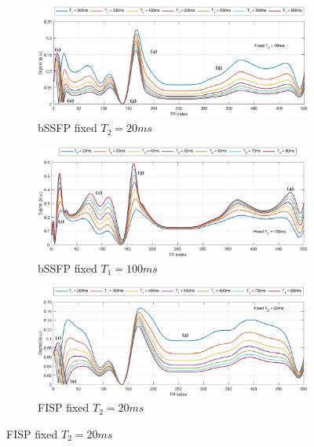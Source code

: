\begin{figure}[ht]
    \centering
    \begin{subfigure}[b]{.75\textwidth}
        \includegraphics[width=\textwidth]{images/mrf/mrfDictionaryBSSFPaDesc}
        \caption{bSSFP fixed $T_2 = 20ms$}
    \end{subfigure}
    
    \begin{subfigure}[b]{.75\textwidth}
        \includegraphics[width=\textwidth]{images/mrf/mrfDictionaryBSSFPbDesc}
        \caption{bSSFP fixed $T_1 = 100ms$}
    \end{subfigure}
    
    \begin{subfigure}[b]{.75\textwidth}
        \includegraphics[width=\textwidth]{images/mrf/mrfDictionaryFISPaDesc}
        \caption{FISP fixed $T_2 = 20ms$}
    \end{subfigure}
    

\end{figure}
